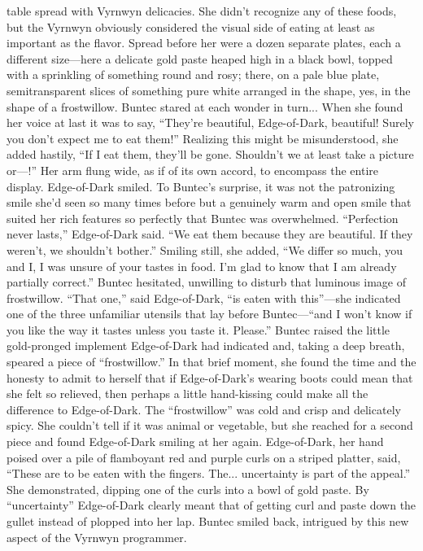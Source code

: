 \documentclass[9pt]{article}
\begin{document}
table spread with Vyrnwyn delicacies. She didn’t recognize any of these foods, but the Vyrnwyn
obviously considered the visual side of eating at least as important as the flavor. Spread before her were
a dozen separate plates, each a different size—here a delicate gold paste heaped high in a black bowl,
topped with a sprinkling of something round and rosy; there, on a pale blue plate, semitransparent slices
of something pure white arranged in the shape, yes, in the shape of a frostwillow.
Buntec stared at each wonder in turn... When she found her voice at last it was to say, “They’re
beautiful, Edge-of-Dark, beautiful! Surely you don’t expect me to eat them!” Realizing this might be
misunderstood, she added hastily, “If I eat them, they’ll be gone. Shouldn’t we at least take a picture
or—!” Her arm flung wide, as if of its own accord, to encompass the entire display.
Edge-of-Dark smiled. To Buntec’s surprise, it was not the patronizing smile she’d seen so many
times before but a genuinely warm and open smile that suited her rich features so perfectly that Buntec
was overwhelmed.
“Perfection never lasts,” Edge-of-Dark said. “We eat them because they are beautiful. If they
weren’t, we shouldn’t bother.” Smiling still, she added, “We differ so much, you and I, I was unsure of
your tastes in food. I’m glad to know that I am already partially correct.”
Buntec hesitated, unwilling to disturb that luminous image of frostwillow.
“That one,” said Edge-of-Dark, “is eaten with this”—she indicated one of the three unfamiliar utensils
that lay before Buntec—“and I won’t know if you like the way it tastes unless you taste it. Please.”
Buntec raised the little gold-pronged implement Edge-of-Dark had indicated and, taking a deep
breath, speared a piece of “frostwillow.” In that brief moment, she found the time and the honesty to
admit to herself that if Edge-of-Dark’s wearing boots could mean that she felt so relieved, then perhaps a
little hand-kissing could make all the difference to Edge-of-Dark.
The “frostwillow” was cold and crisp and delicately spicy. She couldn’t tell if it was animal or
vegetable, but she reached for a second piece and found Edge-of-Dark smiling at her again.
Edge-of-Dark, her hand poised over a pile of flamboyant red and purple curls on a striped platter,
said, “These are to be eaten with the fingers. The... uncertainty is part of the appeal.” She demonstrated,
dipping one of the curls into a bowl of gold paste.
By “uncertainty” Edge-of-Dark clearly meant that of getting curl and paste down the gullet instead of
plopped into her lap. Buntec smiled back, intrigued by this new aspect of the Vyrnwyn programmer.
\end{document}
